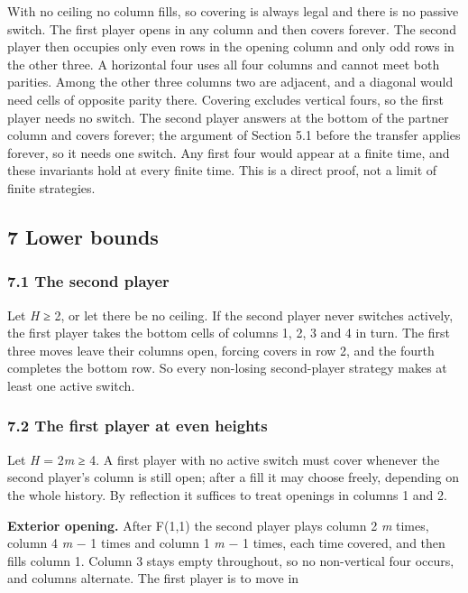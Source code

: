 \documentclass[
  a4paper,
]{article}
\begin{document}
With no ceiling no column fills, so covering is always legal and there
is no passive switch. The first player opens in any column and then
covers forever. The second player then occupies only even rows in the
opening column and only odd rows in the other three. A horizontal four
uses all four columns and cannot meet both parities. Among the other
three columns two are adjacent, and a diagonal would need cells of
opposite parity there. Covering excludes vertical fours, so the first
player needs no switch. The second player answers at the bottom of the
partner column and covers forever; the argument of Section 5.1 before
the transfer applies forever, so it needs one switch. Any first four
would appear at a finite time, and these invariants hold at every finite
time. This is a direct proof, not a limit of finite strategies.

\subsection{7 Lower bounds}\label{lower-bounds}

\subsubsection{7.1 The second player}\label{the-second-player-1}

Let \emph{H} ≥ 2, or let there be no ceiling. If the second player never
switches actively, the first player takes the bottom cells of columns 1,
2, 3 and 4 in turn. The first three moves leave their columns open,
forcing covers in row 2, and the fourth completes the bottom row. So
every non-losing second-player strategy makes at least one active
switch.

\subsubsection{7.2 The first player at even
heights}\label{the-first-player-at-even-heights}

Let \emph{H} = 2\emph{m} ≥ 4. A first player with no active switch must
cover whenever the second player's column is still open; after a fill it
may choose freely, depending on the whole history. By reflection it
suffices to treat openings in columns 1 and 2.

\textbf{Exterior opening.} After F(1,1) the second player plays column 2
\emph{m} times, column 4 \emph{m} − 1 times and column 1 \emph{m} − 1
times, each time covered, and then fills column 1. Column 3 stays empty
throughout, so no non-vertical four occurs, and columns alternate. The
first player is to move in
\end{document}
